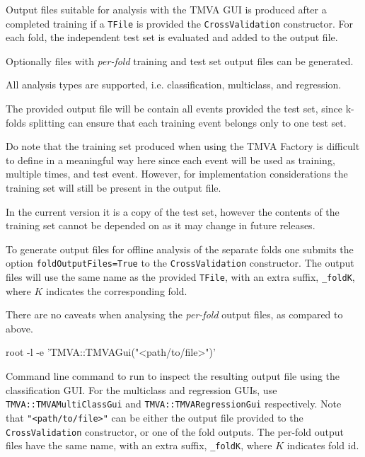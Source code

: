 Output files suitable for analysis with the TMVA GUI is produced after a completed training if a \texttt{TFile} is provided the \texttt{CrossValidation} constructor. For each fold, the independent test set is evaluated and added to the output file.

Optionally files with \emph{per-fold} training and test set output files can be generated. 

All analysis types are supported, i.e. classification, multiclass, and regression.

The provided output file will be contain all events provided the test set, since k-folds splitting can ensure that each training event belongs only to one test set.

Do note that the training set produced when using the TMVA Factory is difficult to define in a meaningful way here since each event will be used as training, multiple times, and test event. However, for implementation considerations the training set will still be present in the output file. 

In the current version it is a copy of the test set, however the contents of the training set cannot be depended on as it may change in future releases.

To generate output files for offline analysis of the separate folds one submits the option \texttt{foldOutputFiles=True} to the \texttt{CrossValidation} constructor. The output files will use the same name as the provided \texttt{TFile}, with an extra suffix, \texttt{\_foldK}, where $K$ indicates the corresponding fold.

There are no caveats when analysing the \emph{per-fold} output files, as compared to above.

\begin{codeexample}
\begin{tmvacode}
root -l -e 'TMVA::TMVAGui("<path/to/file>")'
\end{tmvacode}
\caption[.]{\codeexampleCaptionSize Command line command to run to inspect the resulting output file using the classification GUI.
For the multiclass and regression GUIs, use \texttt{TMVA::TMVAMultiClassGui} and \texttt{TMVA::TMVARegressionGui} respectively. Note that \texttt{"<path/to/file>"} can be either the output file provided to the \texttt{CrossValidation} constructor, or one of the fold outputs.
The per-fold output files have the same name, with an extra suffix, \texttt{\_foldK}, where $K$ indicates fold id.}
\label{code:cv-gui}
\end{codeexample}

